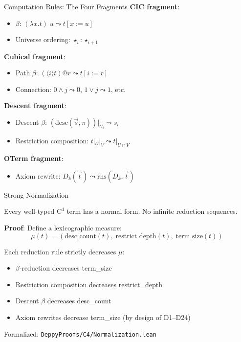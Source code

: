 \documentclass[aspectratio=169,11pt]{beamer}
\newcommand{\Cfour}{\mathrm{C}^4}
\begin{document}
\begin{frame}{Computation Rules: The Four Fragments}
\small
\textbf{CIC fragment}:
\begin{itemize}
\item $\beta$: $(\lambda x.t)\;u \leadsto t[x := u]$
\item Universe ordering: $\star_i : \star_{i+1}$
\end{itemize}

\textbf{Cubical fragment}:
\begin{itemize}
\item Path $\beta$: $(\langle i \rangle t) @ r \leadsto t[i := r]$
\item Connection: $0 \land j \leadsto 0$, $1 \lor j \leadsto 1$, etc.
\end{itemize}

\textbf{Descent fragment}:
\begin{itemize}
\item Descent $\beta$: $(\mathrm{desc}(\vec{s}, \pi))|_{U_i} \leadsto s_i$
\item Restriction composition: $t|_U|_V \leadsto t|_{U \cap V}$
\end{itemize}

\textbf{OTerm fragment}:
\begin{itemize}
\item Axiom rewrite: $D_k(\vec{t}) \leadsto \mathrm{rhs}(D_k, \vec{t})$
\end{itemize}
\end{frame}

\begin{frame}{Strong Normalization}
\begin{theorem}
Every well-typed $\Cfour$ term has a normal form. No infinite reduction sequences.
\end{theorem}

\vspace{0.5em}
\textbf{Proof}: Define a lexicographic measure:
\[
\mu(t) = (\text{desc\_count}(t),\; \text{restrict\_depth}(t),\; \text{term\_size}(t))
\]

Each reduction rule strictly decreases $\mu$:
\begin{itemize}
\item $\beta$-reduction decreases term\_size
\item Restriction composition decreases restrict\_depth
\item Descent $\beta$ decreases desc\_count
\item Axiom rewrites decrease term\_size (by design of D1--D24)
\end{itemize}

Formalized: \texttt{DeppyProofs/C4/Normalization.lean}
\end{frame}
\end{document}
